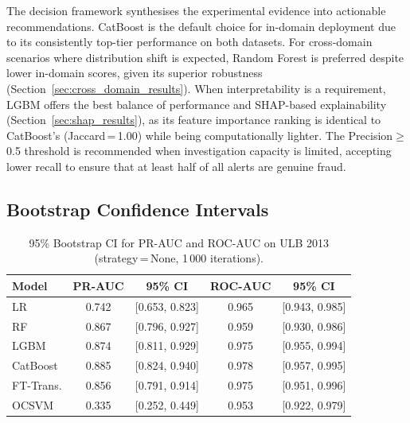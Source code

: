 The decision framework synthesises the experimental evidence into actionable recommendations.
CatBoost is the default choice for in-domain deployment due to its consistently top-tier performance on both datasets.
For cross-domain scenarios where distribution shift is expected, Random Forest is preferred despite lower in-domain scores, given its superior robustness (Section~\ref{sec:cross_domain_results}).
When interpretability is a requirement, LGBM offers the best balance of performance and SHAP-based explainability (Section~\ref{sec:shap_results}), as its feature importance ranking is identical to CatBoost's (Jaccard\,=\,1.00) while being computationally lighter.
The Precision$\geq$0.5 threshold is recommended when investigation capacity is limited, accepting lower recall to ensure that at least half of all alerts are genuine fraud.

\subsection{Bootstrap Confidence Intervals}

\begin{table}[ht!]
\centering
\caption{95\% Bootstrap CI for PR-AUC and ROC-AUC on ULB 2013 (strategy\,=\,None, 1\,000 iterations).}
\label{tab:ci_ulb}
\begin{tabular}{l c c c c}
\toprule
Model & PR-AUC & 95\% CI & ROC-AUC & 95\% CI \\
\midrule
LR         & 0.742 & [0.653, 0.823] & 0.965 & [0.943, 0.985] \\
RF         & 0.867 & [0.796, 0.927] & 0.959 & [0.930, 0.986] \\
LGBM       & 0.874 & [0.811, 0.929] & 0.975 & [0.955, 0.994] \\
CatBoost   & 0.885 & [0.824, 0.940] & 0.978 & [0.957, 0.995] \\
FT-Trans.  & 0.856 & [0.791, 0.914] & 0.975 & [0.951, 0.996] \\
OCSVM      & 0.335 & [0.252, 0.449] & 0.953 & [0.922, 0.979] \\
\bottomrule
\end{tabular}
\end{table}

